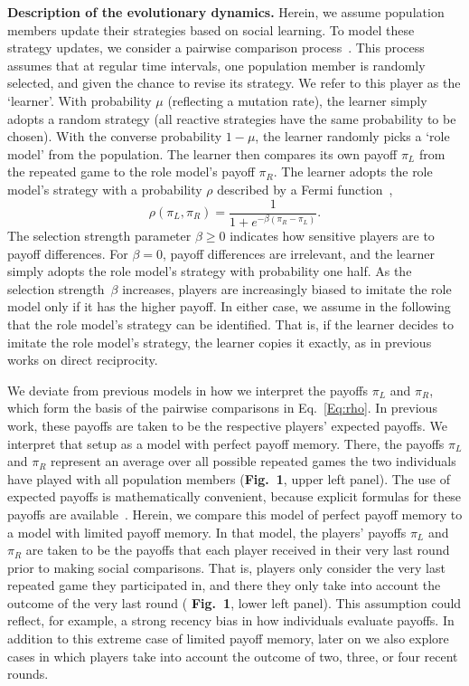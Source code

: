 \documentclass[11pt]{article}
\newcommand{\FigBaseResults}{{\bf Fig.~1}}
\theoremstyle{plainCl1}
\theoremstyle{plainCl2}
\begin{document}
\noindent
{\bf Description of the evolutionary dynamics.}
Herein, we assume population members update their strategies based on social learning. 
To model these strategy updates, we consider a pairwise comparison process~\citep{traulsen2007pairwise}. 
This process assumes that at regular time intervals, one population member is randomly selected, and given the chance to revise its strategy.
We refer to this player as the `learner'. 
With probability $\mu$ (reflecting a mutation rate), the learner simply adopts a random strategy (all reactive strategies have the same probability to be chosen). 
With the converse probability $1\!-\!\mu$, the learner randomly picks a `role model' from the population. 
The learner then compares its own payoff $\pi_L$ from the repeated game to the role model's payoff $\pi_R$. 
The learner adopts the role model's strategy with a probability \(\rho\) described by a Fermi function~\citep{blume:GEB:1995,szabo:PRE:1998}, 
\begin{equation} \label{Eq:rho}
    \rho(\pi_{L}, \pi_{R}) = \frac{1}{1\!+\! e^{- \!\beta (\pi_{R}- \pi_{L})}}.
\end{equation}
The selection strength parameter $\beta\!\ge\!0$ indicates how sensitive players are to payoff differences. 
For $\beta\!=\!0$, payoff differences are irrelevant, and the learner simply adopts the role model's strategy with probability one half. As the selection strength~$\beta$ increases, players are increasingly biased to imitate the role model only if it has the higher payoff. 
In either case, we assume in the following that the role model's strategy can be identified.
That is, if the learner decides to imitate the role model's strategy, the learner copies it exactly, as in previous works on direct reciprocity. 


We deviate from previous models in how we interpret the payoffs $\pi_L$ and $\pi_R$, which form the basis of the pairwise comparisons in Eq.~\eqref{Eq:rho}. 
In previous work, these payoffs are taken to be the respective players' expected payoffs. 
We interpret that setup as a model with perfect payoff memory. 
There, the payoffs  $\pi_L$ and $\pi_R$ represent an average over all possible repeated games the two individuals have played with all population members (\FigBaseResults, upper left panel). 
The use of expected payoffs is mathematically convenient, because explicit formulas for these payoffs are available~\citep{hofbauer1998evolutionary}.
Herein, we compare this model of perfect payoff memory to a model with limited payoff memory. 
In that model, the players' payoffs $\pi_L$ and $\pi_R$ are taken to be the payoffs that each player received in their very last round prior to making social comparisons. 
That is, players only consider the very last repeated game they participated in, and there they only take into account the outcome of the very last round ( \FigBaseResults, lower left panel). 
This assumption could reflect, for example, a strong recency bias in how individuals evaluate payoffs.  
In addition to this extreme case of limited payoff memory, later on we also explore cases in which players take into account the outcome of two, three, or four recent rounds. 
\end{document}
